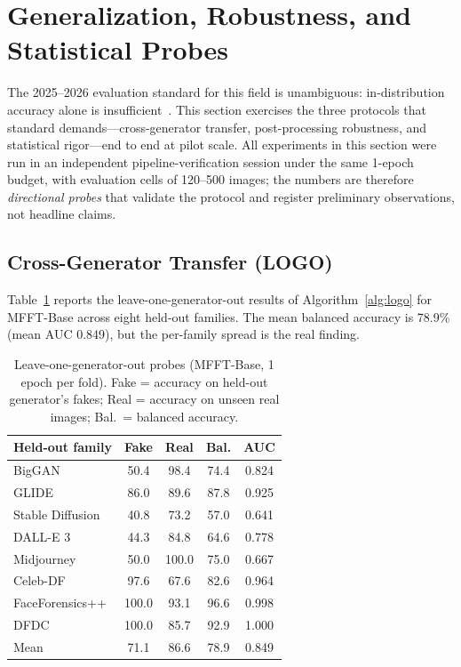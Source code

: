 \documentclass[journal]{IEEEtran}
\begin{document}
\section{Generalization, Robustness, and Statistical Probes}
\label{sec:probes}
The 2025--2026 evaluation standard for this field is unambiguous: in-distribution accuracy alone is insufficient~\cite{yan2025sanity,li2025aigibench}. This section exercises the three protocols that standard demands---cross-generator transfer, post-processing robustness, and statistical rigor---end to end at pilot scale. All experiments in this section were run in an independent pipeline-verification session under the same 1-epoch budget, with evaluation cells of 120--500 images; the numbers are therefore \emph{directional probes} that validate the protocol and register preliminary observations, not headline claims.

\subsection{Cross-Generator Transfer (LOGO)}
\label{sec:logo}
Table~\ref{tab:logo} reports the leave-one-generator-out results of Algorithm~\ref{alg:logo} for MFFT-Base across eight held-out families. The mean balanced accuracy is 78.9\% (mean AUC 0.849), but the per-family spread is the real finding.

\begin{table}[!t]
\renewcommand{\arraystretch}{1.2}
\caption{Leave-one-generator-out probes (MFFT-Base, 1 epoch per fold). Fake = accuracy on held-out generator's fakes; Real = accuracy on unseen real images; Bal.\ = balanced accuracy.}
\label{tab:logo}
\centering
\setlength{\tabcolsep}{3.5pt}
\begin{tabular}{lcccc}
\toprule
Held-out family & Fake & Real & Bal. & AUC \\
\midrule
BigGAN            & 50.4  & 98.4  & 74.4  & 0.824 \\
GLIDE             & 86.0  & 89.6  & 87.8  & 0.925 \\
Stable Diffusion  & 40.8  & 73.2  & 57.0  & 0.641 \\
DALL-E 3          & 44.3  & 84.8  & 64.6  & 0.778 \\
Midjourney        & 50.0  & 100.0 & 75.0  & 0.667 \\
Celeb-DF          & 97.6  & 67.6  & 82.6  & 0.964 \\
FaceForensics++   & 100.0 & 93.1  & 96.6  & 0.998 \\
DFDC              & 100.0 & 85.7  & 92.9  & 1.000 \\
\midrule
Mean              & 71.1  & 86.6  & 78.9  & 0.849 \\
\bottomrule
\end{tabular}
\end{table}
\end{document}
